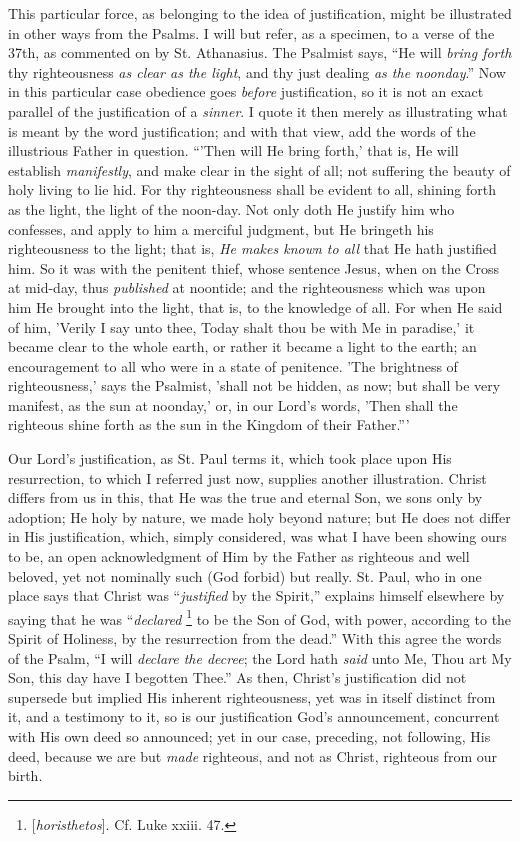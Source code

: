 This particular force, as belonging to the idea of justification,
might be illustrated in other ways from the Psalms. I will but refer,
as a specimen, to a verse of the 37th, as commented on by St.
Athanasius. The Psalmist says, ``He will \emph{bring forth} thy
righteousness \emph{as clear as the light}, and thy just dealing \emph{as
the noonday}.'' Now in this particular case obedience goes \emph{before}
justification, so it is not an exact parallel of the justification of
a \emph{sinner}. I quote it then merely as illustrating what is meant
by the word justification; and with that view, add the words of the
illustrious Father in question. ``'Then will He bring forth,' that
is, He will establish \emph{manifestly}, and make clear in the sight
of all; not suffering the beauty of holy living to lie hid. For thy
righteousness shall be evident to all, shining forth as the light, the
light of the noon-day. Not only doth He justify him who confesses, and
apply to him a merciful judgment, but He bringeth his righteousness to
the light; that is, \emph{He makes known to all} that He hath
justified him. So it was with the penitent thief, whose sentence
Jesus, when on the Cross at mid-day, thus \emph{published} at
noontide; and the righteousness which was upon him He brought into the
light, that is, to the knowledge of all. For when He said of him,
'Verily I say unto thee, Today shalt thou be with Me in paradise,' it
became clear to the whole earth, or rather it became a light to the
earth; an encouragement to all who were in a state of penitence. 'The
brightness of righteousness,' says the Psalmist, 'shall not be hidden,
as now; but shall be very manifest, as the sun at noonday,' or, in our
Lord's words, 'Then shall the righteous shine forth as the sun in the
Kingdom of their Father.'''

Our Lord's justification, as St. Paul terms it, which took place
upon His resurrection, to which I referred just now, supplies another
illustration. Christ differs from us in this, that He was the true and
eternal Son, we sons only by adoption; He holy by nature, we made holy
beyond nature; but He does not differ in His justification, which,
simply considered, was what I have been showing ours to be, an open
acknowledgment of Him by the Father as righteous and well beloved, yet
not nominally such (God forbid) but really. St. Paul, who in one place
says that Christ was ``\emph{justified} by the Spirit,''
explains himself elsewhere by saying that he was ``\emph{declared}
\footnote{[\emph{horisthetos}].
Cf. Luke xxiii. 47.} to be the Son of God,
with power, according to the Spirit of Holiness, by the resurrection
from the dead.'' With this agree the words of the Psalm, ``I
will \emph{declare the decree}; the Lord hath \emph{said} unto Me,
Thou art My Son, this day have I begotten Thee.'' As then,
Christ's justification did not supersede but implied His inherent
righteousness, yet was in itself distinct from it, and a testimony to
it, so is our justification God's announcement, concurrent with His
own deed so announced; yet in our case, preceding, not following, His
deed, because we are but \emph{made} righteous, and not as
Christ, righteous from our birth.

